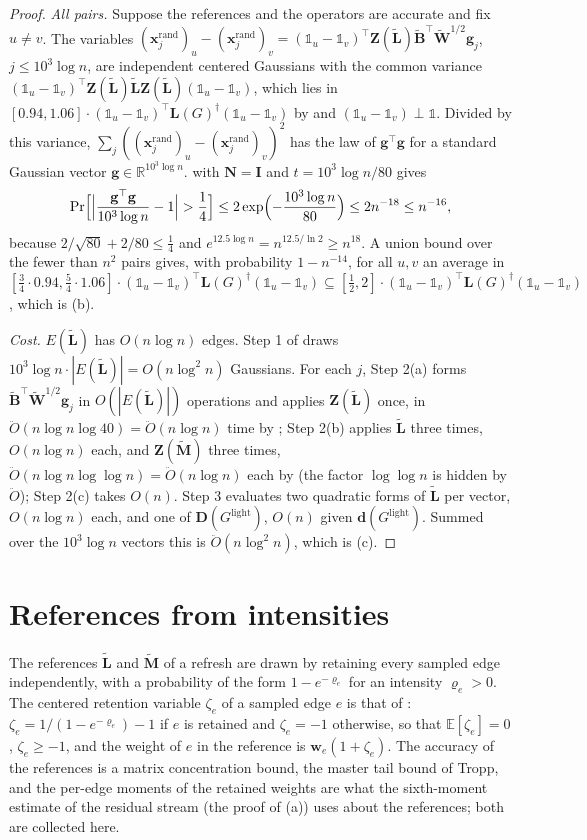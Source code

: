 \documentclass[11pt]{article}
\theoremstyle{remark}
\newcommand{\BB}{\mathbf B}
\newcommand{\BBtil}{{\widetilde{\BB}}}
\newcommand{\dd}{\mathbf d}
\newcommand{\DD}{\mathbf D}
\renewcommand{\gg}{{\mathbf g}}
\newcommand{\II}{\mathbf I}
\newcommand{\LL}{\mathbf L}
\newcommand{\LLtil}{{\widetilde{\LL}}}
\newcommand{\MM}{\mathbf M}
\newcommand{\MMtil}{{\widetilde{\MM}}}
\newcommand{\NN}{\mathbf N}
\newcommand{\ww}{\mathbf w}
\newcommand{\WW}{\mathbf W}
\newcommand{\WWtil}{{\widetilde{\WW}}}
\newcommand{\xx}{\mathbf x}
\newcommand{\xxrand}{\xx^{\mathrm{rand}}}
\newcommand{\ZZ}{\mathbf Z}
\newcommand{\Gl}{G^{\mathrm{light}}}
\newcommand{\R}{\mathbb R}
\newcommand{\Ex}{\mathbb E}
\newcommand{\Odouble}{\ddot{O}}
\newcommand{\oone}{\mathds{1}}
\begin{document}
\begin{proof}
\emph{All pairs.}
Suppose the references and the operators are accurate and fix $u\neq v$.
The variables $(\xxrand_j)_u-(\xxrand_j)_v=(\oone_u-\oone_v)^{\top}\ZZ(\LLtil)\BBtil^{\top}\WWtil^{1/2}\gg_j$,
$j\le10^{3}\log n$, are independent centered Gaussians with the common
variance
$(\oone_u-\oone_v)^{\top}\ZZ(\LLtil)\LLtil\ZZ(\LLtil)(\oone_u-\oone_v)$, which
lies in $[0.94,1.06]\cdot(\oone_u-\oone_v)^{\top}\LL(G)^{\dag}(\oone_u-\oone_v)$
by  and $(\oone_u-\oone_v)\perp\oone$.
Divided by this variance, $\sum_j((\xxrand_j)_u-(\xxrand_j)_v)^{2}$ has the
law of $\gg^{\top}\gg$ for a standard Gaussian vector
$\gg\in\R^{10^{3}\log n}$.
 with $\NN=\II$ and $t=10^{3}\log n/80$ gives
\[
\Pr\Bigl[\Bigl|\frac{\gg^{\top}\gg}{10^{3}\log n}-1\Bigr|>\frac14\Bigr]
\le2\exp\Bigl(-\frac{10^{3}\log n}{80}\Bigr)
\le2n^{-18}\le n^{-16},
\]
because $2/\sqrt{80}+2/80\le\frac14$ and $e^{12.5\log n}=n^{12.5/\ln2}\ge n^{18}$.
A union bound over the fewer than $n^{2}$ pairs gives, with probability
$1-n^{-14}$, for all $u,v$ an average in
$[\frac34\cdot0.94,\frac54\cdot1.06]\cdot(\oone_u-\oone_v)^{\top}\LL(G)^{\dag}(\oone_u-\oone_v)\subseteq[\frac12,2]\cdot(\oone_u-\oone_v)^{\top}\LL(G)^{\dag}(\oone_u-\oone_v)$,
which is (b).

\emph{Cost.}
$E(\LLtil)$ has $O(n\log n)$ edges.
Step 1 of  draws $10^{3}\log n\cdot|E(\LLtil)|=O(n\log^{2}n)$
Gaussians.
For each $j$, Step 2(a) forms $\BBtil^{\top}\WWtil^{1/2}\gg_j$ in
$O(|E(\LLtil)|)$ operations and applies $\ZZ(\LLtil)$ once, in
$\Odouble(n\log n\log40)=\Odouble(n\log n)$ time by ; Step 2(b)
applies $\LLtil$ three times, $O(n\log n)$ each, and $\ZZ(\MMtil)$ three
times, $\Odouble(n\log n\log\log n)=\Odouble(n\log n)$ each by 
(the factor $\log\log n$ is hidden by $\Odouble$); Step 2(c) takes $O(n)$.
Step 3 evaluates two quadratic forms of $\LLtil$ per vector, $O(n\log n)$
each, and one of $\DD(\Gl)$, $O(n)$ given $\dd(\Gl)$.
Summed over the $10^{3}\log n$ vectors this is $\Odouble(n\log^{2}n)$, which
is (c).
\end{proof}

\section{References from intensities}\label{sec:references}

The references $\LLtil$ and $\MMtil$ of a refresh are drawn by retaining
every sampled edge independently, with a probability of the form
$1-e^{-\varrho_e}$ for an intensity $\varrho_e>0$.
The centered retention variable $\zeta_e$ of a sampled edge $e$ is that of
: $\zeta_e=1/(1-e^{-\varrho_e})-1$ if $e$ is retained and
$\zeta_e=-1$ otherwise, so that $\Ex[\zeta_e]=0$, $\zeta_e\ge-1$, and the
weight of $e$ in the reference is $\ww_e(1+\zeta_e)$.
The accuracy of the references is a matrix concentration bound, the master
tail bound of Tropp, and the per-edge moments of the retained weights are
what the sixth-moment estimate of the residual stream
(the proof of (a)) uses about the references; both are collected here.
\end{document}

